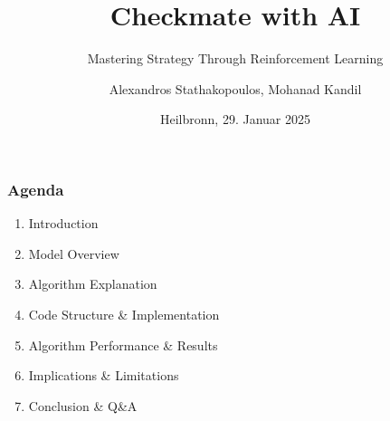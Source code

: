 %
% 
% 
%





\renewcommand{\PersonTitel}{}
\newcommand{\Datum}{\today}

\renewcommand{\PraesentationFusszeileZusatz}{}

\title{Checkmate with AI}
\subtitle{Mastering Strategy Through Reinforcement Learning}
\author{Alexandros Stathakopoulos, Mohanad Kandil}
\institute[]{\UniversitaetName}
\date[\Datum]{Heilbronn, 29. Januar 2025}
\subject{}



\graphicspath{ {Ressourcen/_Bilder/} }
\PraesentationMasterStandard

\PraesentationTitelseite %

\begin{frame}
    \frametitle{Agenda}
    \begin{enumerate}
        \item Introduction
        \item Model Overview
        \item Algorithm Explanation
        \item Code Structure \& Implementation
        \item Algorithm Performance \& Results
        \item Implications \& Limitations
        \item Conclusion \& Q\&A
    \end{enumerate}
\end{frame}

